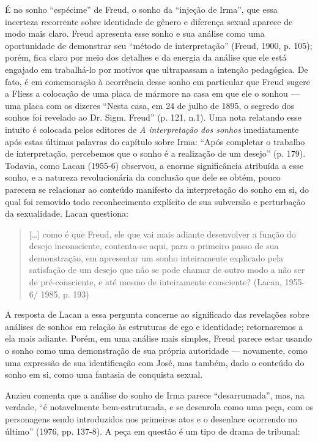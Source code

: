 É no sonho ``espécime'' de Freud, o sonho da ``injeção de Irma'', que
essa incerteza recorrente sobre identidade de gênero e diferença sexual
aparece de modo mais claro. Freud apresenta esse sonho e sua análise
como uma oportunidade de demonstrar seu ``método de interpretação''
(Freud, 1900, p. 105); porém, fica claro por meio dos detalhes e da
energia da análise que ele está engajado em trabalhá-lo por motivos que
ultrapassam a intenção pedagógica. De fato, é em comemoração à
ocorrência desse sonho em particular que Freud sugere a Fliess a
colocação de uma placa de mármore na casa em que ele o sonhou --- uma
placa com os dizeres ``Nesta casa, em 24 de julho de 1895, o segredo dos
sonhos foi revelado ao Dr. Sigm. Freud'' (p. 121, n.1). Uma nota
relatando esse intuito é colocada pelos editores de \emph{A
interpretação dos sonhos} imediatamente após estas últimas palavras do
capítulo sobre Irma: ``Após completar o trabalho de interpretação,
percebemos que o sonho é a realização de um desejo'' (p. 179). Todavia,
como Lacan (1955-6) observou, a enorme significância atribuída a esse
sonho, e a natureza revolucionária da conclusão que dele se obtém, pouco
parecem se relacionar ao conteúdo manifesto da interpretação do sonho em
si, do qual foi removido todo reconhecimento explícito de sua subversão
e perturbação da sexualidade. Lacan questiona:

\begin{quote}
{[}\ldots{}{]} como é que Freud, ele que vai mais adiante desenvolver a
função do desejo inconsciente, contenta-se aqui, para o primeiro passo
de sua demonstração, em apresentar um sonho inteiramente explicado pela
satisfação de um desejo que não se pode chamar de outro modo a não ser
de pré-consciente, e até mesmo de inteiramente consciente? (Lacan,
1955-6/ 1985, p. 193)
\end{quote}

A resposta de Lacan a essa pergunta concerne ao significado das
revelações sobre análises de sonhos em relação às estruturas de ego e
identidade; retornaremos a ela mais adiante. Porém, em uma análise mais
simples, Freud parece estar usando o sonho como uma demonstração de sua
própria autoridade --- novamente, como uma expressão de sua identificação
com José, mas também, dado o conteúdo do sonho em si, como uma fantasia
de conquista sexual.

Anzieu comenta que a análise do sonho de Irma parece ``desarrumada'',
mas, na verdade, ``é notavelmente bem-estruturada, e se desenrola como
uma peça, com os personagens sendo introduzidos nos primeiros atos e o
desenlace ocorrendo no último'' (1976, pp. 137-8). A peça em questão é
um tipo de drama de tribunal:

